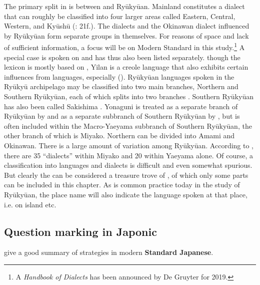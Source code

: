 The primary split in  is between  and Ryūkyūan. Mainland  constitutes a dialect  that can roughly be classified into four larger areas called Eastern, Central, Western, and Kyūshū (\citealt{Hasegawa2015}: 21f.). The  dialects and the Okinawan dialect influenced by Ryūkyūan form separate groups in themselves. For reasons of space and lack of sufficient information, a focus will be on Modern Standard  in this study.\footnote{A \textit{Handbook of  Dialects} has been announced by De Gruyter for 2019.} A special case is  spoken on  and has thus also been listed separately.  though the lexicon is mostly based on , Yilan is a creole language that also exhibits certain influences from  languages, especially  (\citealt{Chien2010}). Ryūkyūan languages spoken in the Ryūkyū archipelago may be classified into two main branches, Northern and Southern Ryūkyūan, each of which splits into two branches \citep{Shimoji2010}. Southern Ryūkyūan has also been called Sakishima \citep{Bentley2008a}. Yonaguni is treated as a separate branch of Ryūkyūan by \citet{Izuyama2012} and as a separate subbranch of Southern Ryūkyūan by \citet[242]{Bentley2008a}, but is often included within the Macro-Yaeyama subbranch of Southern Ryūkyūan, the other branch of which is Miyako. Northern   can be divided into Amami and Okinawan. There is a large amount of variation among Ryūkyūan. According to \citet[380]{Lawrence2012}, there are 35 “dialects” within Miyako and 20 within Yaeyama alone. Of course, a classification into languages and dialects is difficult and even somewhat spurious. But clearly the  can be considered a treasure trove of , of which only some parts can be included in this chapter. As is common practice today in the study of Ryūkyūan, the place name will also indicate the language spoken at that place, i.e.  on  island etc.

\subsection{Question marking in Japonic}\label{sec:5.6.2}

\citet[295]{TranterKizu2012} give a good summary of  strategies in modern \textbf{Standard Japanese}.


